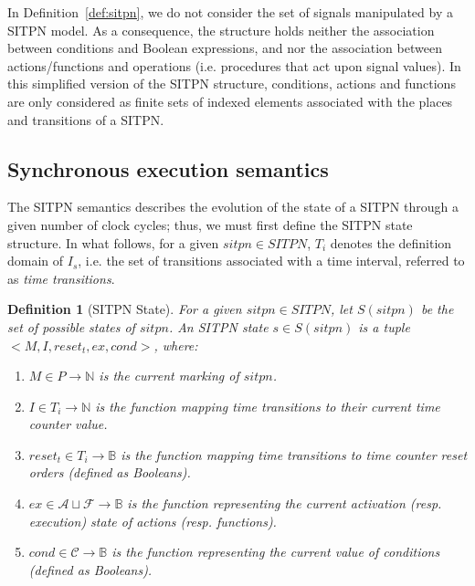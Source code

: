 \documentclass[pdflatex,sn-mathphys]{sn-jnl}%
\theoremstyle{thmstyleone}%
\theoremstyle{thmstyletwo}%
\theoremstyle{thmstylethree}%
\newtheorem{definition}{Definition}%
\begin{document}
In Definition~\ref{def:sitpn}, we do not consider the set of \vhdl{}
signals manipulated by a SITPN model. As a consequence, the structure
holds neither the association between conditions and Boolean
expressions, and nor the association between actions/functions and
operations (i.e. \vhdl{} procedures that act upon signal values).  In
this simplified version of the SITPN structure, conditions, actions
and functions are only considered as finite sets of indexed elements
associated with the places and transitions of a SITPN.

\subsection{Synchronous execution semantics}
\label{subsec:hpn-particularities}

The SITPN semantics describes the evolution of the state of a SITPN
through a given number of clock cycles; thus, we must first define the
SITPN state structure. In what follows, for a given $sitpn\in{}SITPN$,
$T_i$ denotes the definition domain of $I_s$, i.e. the set of
transitions associated with a time interval, referred to as
\textit{time transitions}.

\begin{definition}[SITPN State]
  \label{def:sitpnstate}
  For a given $sitpn\in{}SITPN$, let $S(sitpn)$ be the set of possible
  states of $sitpn$. An SITPN state $s\in{}S(sitpn)$ is a tuple
  ${<}M,I,reset_t,ex,cond{>}$, where:
  \begin{enumerate}
  \item $M\in{}P\rightarrow\mathbb{N}$ is the current marking of
    $sitpn$.
  \item\label{item:sitpn-state-tc} $I\in{}T_i{}\rightarrow\mathbb{N}$
    is the function mapping time transitions to their current time
    counter value.
  \item\label{item:sitpn-state-rst}
    $reset_t\in{}T_i\rightarrow\mathbb{B}$ is the function mapping
    time transitions to time counter reset orders (defined as
    Booleans).
  \item $ex\in{}\mathcal{A}\sqcup\mathcal{F}\rightarrow\mathbb{B}$ is
    the function representing the current activation (resp. execution)
    state of actions (resp. functions).
  \item $cond\in\mathcal{C}\rightarrow\mathbb{B}$ is the function representing the
    current value of conditions (defined as Booleans).
  \end{enumerate}
\end{definition}
\end{document}
